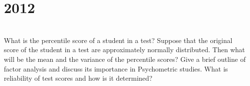 \section*{2012}
\vspace{-.5cm}
\hrulefill \smallskip\\
 What is the percentile score of a student in a test? Suppose that the original score of the student in a test are approximately normally distributed. Then what will be the mean and the variance of the percentile scores?
\myline
{} Give a brief outline of factor analysis and discuss its importance in Psychometric studies.
\myline
{} What is reliability of test scores and how is it determined?
